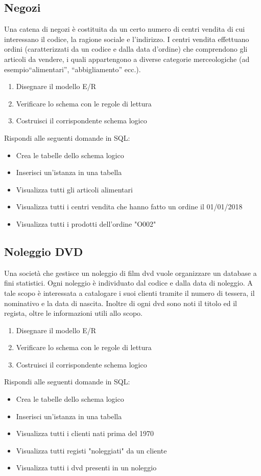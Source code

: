 \documentclass{article}
\begin{document}
	\subsection{Negozi}
	Una catena di negozi è costituita da un certo numero di centri vendita di cui interessano il codice, la ragione sociale e l’indirizzo. I centri vendita effettuano ordini (caratterizzati da un codice e dalla data d’ordine) che comprendono gli articoli da vendere, i quali appartengono a diverse categorie merceologiche (ad esempio“alimentari”, “abbigliamento” ecc.).
	\begin{enumerate}
		\item Disegnare il modello E/R
		\item Verificare lo schema con le regole di lettura
		\item Costruisci il corrispondente schema logico
	\end{enumerate}
	Rispondi alle seguenti domande in SQL:
	\begin{itemize}
		\item Crea le tabelle dello schema logico
		\item Inserisci un'istanza in una tabella
		\item Visualizza tutti gli articoli alimentari
		\item Visualizza tutti i centri vendita che hanno fatto un ordine il 01/01/2018
		\item Visualizza tutti i prodotti dell'ordine "O002"
	\end{itemize}

	\subsection{Noleggio DVD}
	Una società che gestisce un noleggio di film dvd vuole organizzare un database a fini statistici. Ogni noleggio è individuato dal codice e dalla data di noleggio. A tale scopo è interessata a catalogare i suoi clienti tramite il numero di tessera, il nominativo e la data di nascita. Inoltre di ogni dvd sono noti il titolo ed il regista, oltre le informazioni utili allo scopo.
	\begin{enumerate}
		\item Disegnare il modello E/R
		\item Verificare lo schema con le regole di lettura
		\item Costruisci il corrispondente schema logico
	\end{enumerate}
	Rispondi alle seguenti domande in SQL:
	\begin{itemize}
		\item Crea le tabelle dello schema logico
		\item Inserisci un'istanza in una tabella
		\item Visualizza tutti i clienti nati prima del 1970
		\item Visualizza tutti registi "noleggiati" da un cliente
		\item Visualizza tutti i dvd presenti in un noleggio
	\end{itemize}
\end{document}
